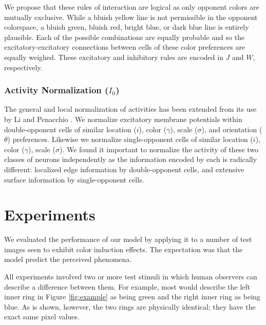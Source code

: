 \documentclass[journal,onecolumn]{IEEEtran}
\begin{document}
We propose that these rules of interaction are logical as only opponent colors are mutually exclusive. While a bluish yellow line is not permissible in the opponent colorspace, a bluish green, bluish red, bright blue, or dark blue line is entirely plausible. Each of the possible combinations are equally probable and so the excitatory-excitatory connections between cells of these color preferences are equally weighed. These excitatory and inhibitory rules are encoded in $J$ and $W$, respectively.

\subsubsection*{Activity Normalization ($I_0$)}
The general and local normalization of activities \cite{heeger:1993} has been extended from its use by Li \cite{li:1999} and Penacchio \cite{penacchio:2013}. We normalize excitatory membrane potentials within double-opponent cells of similar location ($i$), color ($\gamma$), scale ($\sigma$), and orientation ($\theta$) preferences. Likewise we normalize single-opponent cells of similar location ($i$), color ($\gamma$), scale ($\sigma$). We found it important to normalize the activity of these two classes of neurons independently as the information encoded by each is radically different: localized edge information by double-opponent cells, and extensive surface information by single-opponent cells.

%
%
%
\section{Experiments}

We evaluated the performance of our model by applying it to a number of test images seen to exhibit color induction effects. The expectation was that the model predict the perceived phenomena.

All experiments involved two or more test stimuli in which human observers can describe a difference between them. For example, most would describe the left inner ring in Figure \ref{fig:example} as being green and the right inner ring as being blue. As is shown, however, the two rings are physically identical; they have the exact same pixel values.
\end{document}
